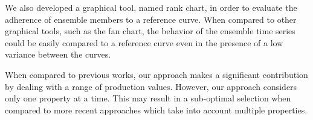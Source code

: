 \documentclass{sigchi-ext}
\begin{document}
We also developed a graphical tool, named rank chart, in order to evaluate the adherence of ensemble members to a reference curve. When compared to other graphical tools, such as the fan chart, the behavior of the ensemble time series could be easily compared to a reference curve even in the presence of a low variance between the curves.

When compared to previous works, our approach makes a significant contribution by dealing with a range of production values. However, our approach considers only one property at a time. This may result in a sub-optimal selection when compared to more recent approaches \cite{selection-sarma:2013, meira:2016} which take into account multiple properties.

\balance{} 

% 

% 

\end{document}
